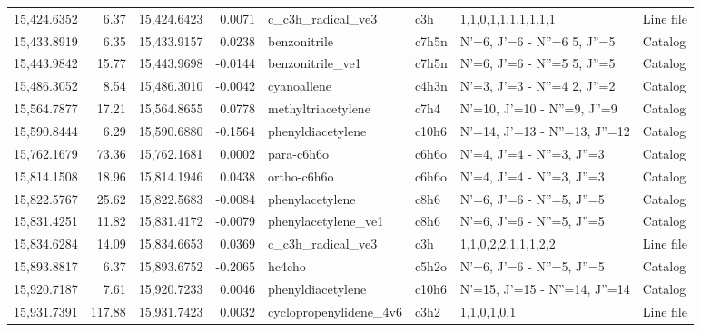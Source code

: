 \begin{longtable}{rrrrllll}
15,424.6352 &      6.37 &       15,424.6423 &    0.0071 &           c_c3h_radical_ve3 &     c3h &                  1,1,0,1,1,1,1,1,1,1 &  Line file \\
15,433.8919 &      6.35 &       15,433.9157 &    0.0238 &                benzonitrile &   c7h5n &      N'=6, J'=6 - N''=6     5, J''=5 &    Catalog \\
15,443.9842 &     15.77 &       15,443.9698 &   -0.0144 &            benzonitrile_ve1 &   c7h5n &      N'=6, J'=6 - N''=5     5, J''=5 &    Catalog \\
15,486.3052 &      8.54 &       15,486.3010 &   -0.0042 &                 cyanoallene &   c4h3n &      N'=3, J'=3 - N''=4     2, J''=2 &    Catalog \\
15,564.7877 &     17.21 &       15,564.8655 &    0.0778 &          methyltriacetylene &    c7h4 &          N'=10, J'=10 - N''=9, J''=9 &    Catalog \\
15,590.8444 &      6.29 &       15,590.6880 &   -0.1564 &           phenyldiacetylene &   c10h6 &        N'=14, J'=13 - N''=13, J''=12 &    Catalog \\
15,762.1679 &     73.36 &       15,762.1681 &    0.0002 &                  para-c6h6o &   c6h6o &            N'=4, J'=4 - N''=3, J''=3 &    Catalog \\
15,814.1508 &     18.96 &       15,814.1946 &    0.0438 &                 ortho-c6h6o &   c6h6o &            N'=4, J'=4 - N''=3, J''=3 &    Catalog \\
15,822.5767 &     25.62 &       15,822.5683 &   -0.0084 &             phenylacetylene &    c8h6 &            N'=6, J'=6 - N''=5, J''=5 &    Catalog \\
15,831.4251 &     11.82 &       15,831.4172 &   -0.0079 &         phenylacetylene_ve1 &    c8h6 &            N'=6, J'=6 - N''=5, J''=5 &    Catalog \\
15,834.6284 &     14.09 &       15,834.6653 &    0.0369 &           c_c3h_radical_ve3 &     c3h &                  1,1,0,2,2,1,1,1,2,2 &  Line file \\
15,893.8817 &      6.37 &       15,893.6752 &   -0.2065 &                      hc4cho &   c5h2o &            N'=6, J'=6 - N''=5, J''=5 &    Catalog \\
15,920.7187 &      7.61 &       15,920.7233 &    0.0046 &           phenyldiacetylene &   c10h6 &        N'=15, J'=15 - N''=14, J''=14 &    Catalog \\
15,931.7391 &    117.88 &       15,931.7423 &    0.0032 &      cyclopropenylidene_4v6 &    c3h2 &                          1,1,0,1,0,1 &  Line file \\

\end{longtable}
